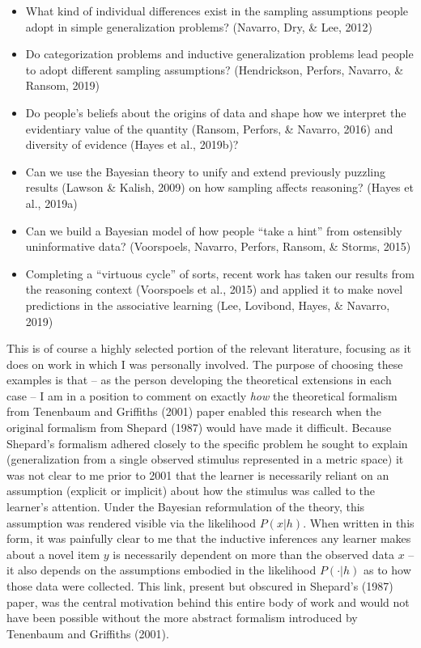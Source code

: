 \documentclass[english,doc]{apa6}
\providecommand{\tightlist}{%
  \setlength{\itemsep}{0pt}\setlength{\parskip}{0pt}}
\begin{document}
\begin{itemize}
\tightlist
\item
  What kind of individual differences exist in the sampling assumptions people adopt in simple generalization problems? (Navarro, Dry, \& Lee, 2012)
\item
  Do categorization problems and inductive generalization problems lead people to adopt different sampling assumptions? (Hendrickson, Perfors, Navarro, \& Ransom, 2019)
\item
  Do people's beliefs about the origins of data and shape how we interpret the evidentiary value of the quantity (Ransom, Perfors, \& Navarro, 2016) and diversity of evidence (Hayes et al., 2019b)?
\item
  Can we use the Bayesian theory to unify and extend previously puzzling results (Lawson \& Kalish, 2009) on how sampling affects reasoning? (Hayes et al., 2019a)
\item
  Can we build a Bayesian model of how people ``take a hint'' from ostensibly uninformative data? (Voorspoels, Navarro, Perfors, Ransom, \& Storms, 2015)
\item
  Completing a ``virtuous cycle'' of sorts, recent work has taken our results from the reasoning context (Voorspoels et al., 2015) and applied it to make novel predictions in the associative learning (Lee, Lovibond, Hayes, \& Navarro, 2019)
\end{itemize}

This is of course a highly selected portion of the relevant literature, focusing as it does on work in which I was personally involved. The purpose of choosing these examples is that -- as the person developing the theoretical extensions in each case -- I am in a position to comment on exactly \emph{how} the theoretical formalism from Tenenbaum and Griffiths (2001) paper enabled this research when the original formalism from Shepard (1987) would have made it difficult. Because Shepard's formalism adhered closely to the specific problem he sought to explain (generalization from a single observed stimulus represented in a metric space) it was not clear to me prior to 2001 that the learner is necessarily reliant on an assumption (explicit or implicit) about how the stimulus was called to the learner's attention. Under the Bayesian reformulation of the theory, this assumption was rendered visible via the likelihood \(P(x|h)\). When written in this form, it was painfully clear to me that the inductive inferences any learner makes about a novel item \(y\) is necessarily dependent on more than the observed data \(x\) -- it also depends on the assumptions embodied in the likelihood \(P(\cdot|h)\) as to how those data were collected. This link, present but obscured in Shepard's (1987) paper, was the central motivation behind this entire body of work and would not have been possible without the more abstract formalism introduced by Tenenbaum and Griffiths (2001).
\end{document}
